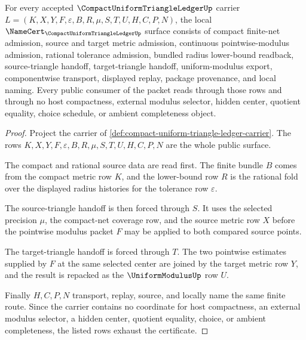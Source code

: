 \begin{theorem}
\label{thm:compact-uniform-triangle-ledger-namecert-obligations}
For every accepted $\CompactUniformTriangleLedgerUp$ carrier $L=(K,X,Y,F,\varepsilon,B,R,\mu,S,T,U,H,C,P,N)$, the local $\NameCert_{\CompactUniformTriangleLedgerUp}$ surface consists of compact finite-net admission, source and target metric admission, continuous pointwise-modulus admission, rational tolerance admission, bundled radius lower-bound readback, source-triangle handoff, target-triangle handoff, uniform-modulus export, componentwise transport, displayed replay, package provenance, and local naming. Every public consumer of the packet reads through those rows and through no host compactness, external modulus selector, hidden center, quotient equality, choice schedule, or ambient completeness object.
\end{theorem}
\begin{proof}
Project the carrier of \autoref{def:compact-uniform-triangle-ledger-carrier}. The rows $K,X,Y,F,\varepsilon,B,R,\mu,S,T,U,H,C,P,N$ are the whole public surface.

The compact and rational source data are read first. The finite bundle $B$ comes from the compact metric row $K$, and the lower-bound row $R$ is the rational fold over the displayed radius histories for the tolerance row $\varepsilon$.

The source-triangle handoff is then forced through $S$. It uses the selected precision $\mu$, the compact-net coverage row, and the source metric row $X$ before the pointwise modulus packet $F$ may be applied to both compared source points.

The target-triangle handoff is forced through $T$. The two pointwise estimates supplied by $F$ at the same selected center are joined by the target metric row $Y$, and the result is repacked as the $\UniformModulusUp$ row $U$.

Finally $H,C,P,N$ transport, replay, source, and locally name the same finite route. Since the carrier contains no coordinate for host compactness, an external modulus selector, a hidden center, quotient equality, choice, or ambient completeness, the listed rows exhaust the certificate.
\end{proof}

